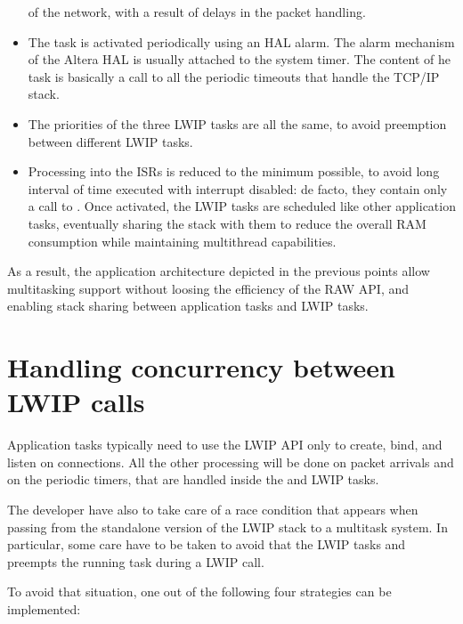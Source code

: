 \begin{itemize}
  of the network, with a result of delays in the packet handling.
\item The  task is activated periodically using an HAL
  alarm. The alarm mechanism of the Altera HAL is usually attached to
  the system timer. The content of he task is basically a call to all
  the periodic timeouts that handle the TCP/IP stack.
\item The priorities of the three LWIP tasks are all the same, to
  avoid preemption between different LWIP tasks.
\item Processing into the ISRs is reduced to the minimum possible, to
  avoid long interval of time executed with interrupt disabled: de
  facto, they contain only a call to . Once
  activated, the LWIP tasks are scheduled like other application
  tasks, eventually sharing the stack with them to reduce the overall
  RAM consumption while maintaining multithread capabilities.
\end{itemize}

As a result, the application architecture depicted in the previous
points allow multitasking support without loosing the efficiency of
the RAW API, and enabling stack sharing between application tasks and
LWIP tasks.

\section{Handling concurrency between LWIP calls}

Application tasks typically need to use the LWIP API only to create,
bind, and listen on connections. All the other processing will be done
on packet arrivals and on the periodic timers, that are handled inside
the  and  LWIP tasks. 

The developer have also to take care of a race condition that appears
when passing from the standalone version of the LWIP stack to a
multitask system. In particular, some care have to be taken to avoid
that the LWIP tasks  and 
preempts the running task during a LWIP call.

To avoid that situation, one out of the following four strategies can
be implemented:

